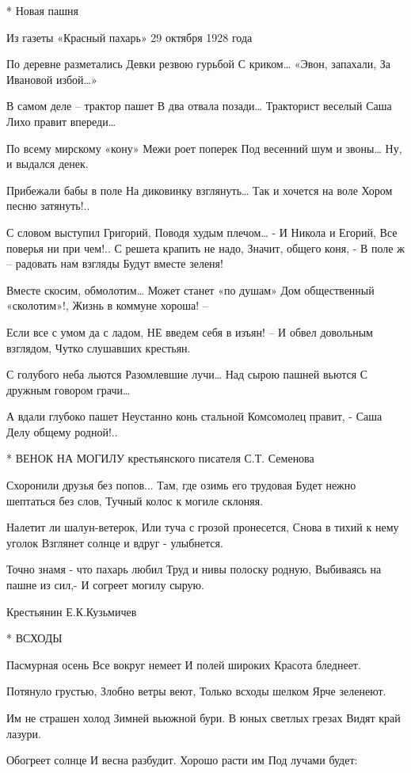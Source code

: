 * Новая пашня

Из газеты «Красный пахарь» 29 октября 1928 года

По деревне разметались
Девки резвою гурьбой
С криком… «Эвон, запахали,
За Ивановой избой…»

В самом деле – трактор пашет
В два отвала позади…
Тракторист веселый Саша
Лихо правит впереди…

По всему мирскому «кону»
Межи роет поперек
Под весенний шум и звоны…
Ну, и выдался денек.

Прибежали бабы в поле
На диковинку взглянуть…
Так и хочется на воле
Хором песню затянуть!..

С словом выступил Григорий,
Поводя худым плечом…
- И Никола и Егорий,
Все поверья ни при чем!..
С решета крапить не надо,
Значит, общего коня, -
В поле ж – радовать нам взгляды
Будут вместе зеленя!

Вместе скосим, обмолотим…
Может станет «по душам»
Дом общественный «сколотим»!,
Жизнь в коммуне хороша! –

Если все с умом да с ладом,
НЕ введем себя в изъян! –
И обвел довольным взглядом,
Чутко слушавших крестьян.

С голубого неба льются
Разомлевшие лучи…
Над сырою пашней вьются
С дружным говором грачи…

А вдали глубоко пашет
Неустанно конь стальной
Комсомолец правит, - Саша
Делу общему родной!..


* ВЕНОК НА МОГИЛУ крестьянского писателя С.Т. Семенова


Схоронили друзья без попов...
Там, где озимь его трудовая
Будет нежно шептаться без слов,
Тучный колос к могиле склоняя.

Налетит ли шалун-ветерок,
Или туча с грозой пронесется,
Снова в тихий к нему уголок
Взглянет солнце и вдруг - улыбнется.

Точно знамя - что пахарь любил
Труд и нивы полоску родную,
Выбиваясь на пашне из сил,-
И согреет могилу сырую.

Крестьянин Е.К.Кузьмичев


* ВСХОДЫ


Пасмурная осень
     Все вокруг немеет
И полей широких
     Красота бледнеет.

Потянуло грустью,
     Злобно ветры веют,
Только всходы шелком
     Ярче зеленеют.

Им не страшен холод
     Зимней вьюжной бури.
В юных светлых грезах
     Видят край лазури.

Обогреет солнце
     И весна разбудит.
Хорошо расти им
     Под лучами будет:

